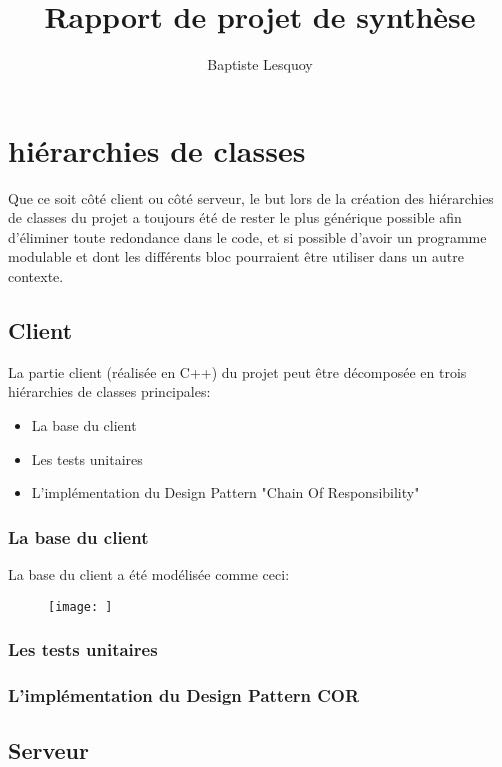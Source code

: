 \documentclass[12pt,a4paper]{report}
\author{Baptiste Lesquoy}
\title{Rapport de projet de synthèse}
\begin{document}
\maketitle
\newpage


\tableofcontents
\newpage

\chapter{hiérarchies de classes}
Que ce soit côté client ou côté serveur, le but lors de la création des hiérarchies de classes du projet a toujours été de rester le plus générique possible afin d'éliminer toute redondance dans le code, et si possible d'avoir un programme modulable et dont les différents bloc pourraient être utiliser dans un autre contexte.

\section{Client}
La partie client (réalisée en C++) du projet peut être décomposée en trois hiérarchies de classes principales:
\begin{itemize}
\item La base du client
\item Les tests unitaires
\item L'implémentation du Design Pattern "Chain Of Responsibility"
\end{itemize}

\subsection{La base du client}
La base du client a été modélisée comme ceci:
\begin{figure}
\texttt{[image: ]}
\end{figure}

\subsection{Les tests unitaires}
\subsection{L'implémentation du Design Pattern COR}


\section{Serveur}
\end{document}
